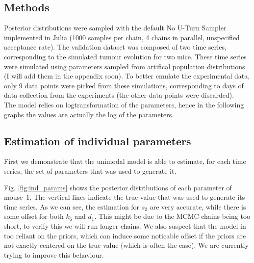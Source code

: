 \documentclass[11pt]{article}
\begin{document}
        \subsection{Methods}
    Posterior distributions were sampled with the default No U-Turn Sampler implemented in Julia (1000 samples per chain, 4 chains in parallel, unspecified acceptance rate). The validation dataset was composed of two time series, corresponding to the simulated tumour evolution for two mice.  These time series were simulated using parameters sampled from artifical population distributions (I will add them in the appendix soon). To better emulate the experimental data, only 9 data points were picked from these simulations, corresponding to days of data collection from the experiments (the other data points were discarded).\\
    The model relies on logtransformation of the parameters, hence in the following graphs the values are actually the log of the parameters.

        \subsection{Estimation of individual parameters}
    First we demonstrate that the unimodal model is able to estimate, for each time series, the set of parameters that was used to generate it.

    Fig. \ref{fig:ind_params} shows the posterior distributions of each parameter of mouse~1. The vertical lines indicate the true value that was used to generate its time series. As we can see, the estimation for $s_2$ are very accurate, while there is some offset for both $k_6$ and $d_1$. This might be due to the MCMC chains being too short, to verify this we will run longer chains. We also suspect that the model in too reliant on the priors, which can induce some noticable offset if the priors are not exactly centered on the true value (which is often the case). We are currently trying to improve this behaviour. 
\end{document}
